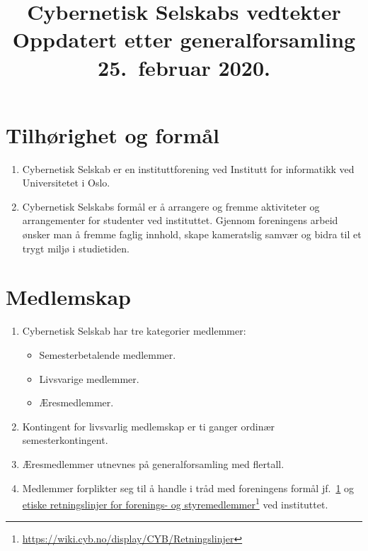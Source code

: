 \documentclass[8pt,norsk,a4paper]{article}
\title{\textbf{Cybernetisk Selskabs vedtekter} \\
	{\large Oppdatert etter generalforsamling 25.~februar 2020.}}
\date{}
\author{}
\newcommand\fhref[2]{%
	\href{#1}{#2}\footnote{\url{#1}}%
}
\begin{document}
\maketitle{}

\section{Tilhørighet og formål}\label{sec:formaal}
\begin{enumerate}
	\item{Cybernetisk Selskab er en instituttforening ved Institutt for informatikk ved Universitetet i Oslo.}
	\item{Cybernetisk Selskabs formål er å arrangere og fremme aktiviteter og arrangementer for studenter ved instituttet. Gjennom foreningens arbeid ønsker man å fremme faglig innhold, skape kameratslig samvær og bidra til et trygt miljø i studietiden.}
\end{enumerate}

\section{Medlemskap}\label{sec:medlemskap}
\begin{enumerate}
	\item{Cybernetisk Selskab har tre kategorier medlemmer:}
	\begin{itemize}
		\item{Semesterbetalende medlemmer.}
		\item{Livsvarige medlemmer.}
		\item{Æresmedlemmer.}
	\end{itemize}
	\item{Kontingent for livsvarlig medlemskap er ti ganger ordinær semesterkontingent.}
	\item{Æresmedlemmer utnevnes på generalforsamling med  flertall.}
	\item Medlemmer forplikter seg til å handle i tråd med foreningens formål jf.~\ref{sec:formaal} og \fhref{https://wiki.cyb.no/display/CYB/Retningslinjer}{etiske retningslinjer for forenings- og styremedlemmer} ved instituttet\footnotemark.\label{item:forpliktelser}
\end{enumerate}

\end{document}
